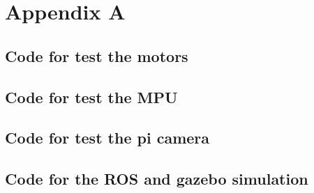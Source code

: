 \appendix
\chapter{Appendix A}

\section{Code for test the motors}

\section{Code for test the MPU}

\section{Code for test the pi camera}

\section{Code for the ROS and gazebo simulation}